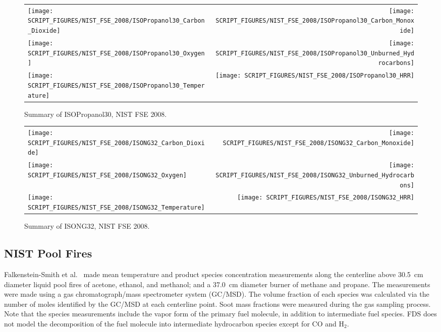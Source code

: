 \begin{figure}[p]
\begin{tabular*}{\textwidth}{l@{\extracolsep{\fill}}r}
\texttt{[image: SCRIPT\_FIGURES/NIST\_FSE\_2008/ISOPropanol30\_Carbon\_Dioxide]} &
\texttt{[image: SCRIPT\_FIGURES/NIST\_FSE\_2008/ISOPropanol30\_Carbon\_Monoxide]} \\
\texttt{[image: SCRIPT\_FIGURES/NIST\_FSE\_2008/ISOPropanol30\_Oxygen]} &
\texttt{[image: SCRIPT\_FIGURES/NIST\_FSE\_2008/ISOPropanol30\_Unburned\_Hydrocarbons]} \\
\texttt{[image: SCRIPT\_FIGURES/NIST\_FSE\_2008/ISOPropanol30\_Temperature]} &
\texttt{[image: SCRIPT\_FIGURES/NIST\_FSE\_2008/ISOPropanol30\_HRR]}
\end{tabular*}
\caption[Summary of ISOPropanol30, NIST FSE 2008]{Summary of ISOPropanol30, NIST FSE 2008.}
\label{NIST_FSE_1994_ISOPropanol30}
\end{figure}

\begin{figure}[p]
\begin{tabular*}{\textwidth}{l@{\extracolsep{\fill}}r}
\texttt{[image: SCRIPT\_FIGURES/NIST\_FSE\_2008/ISONG32\_Carbon\_Dioxide]} &
\texttt{[image: SCRIPT\_FIGURES/NIST\_FSE\_2008/ISONG32\_Carbon\_Monoxide]} \\
\texttt{[image: SCRIPT\_FIGURES/NIST\_FSE\_2008/ISONG32\_Oxygen]} &
\texttt{[image: SCRIPT\_FIGURES/NIST\_FSE\_2008/ISONG32\_Unburned\_Hydrocarbons]} \\
\texttt{[image: SCRIPT\_FIGURES/NIST\_FSE\_2008/ISONG32\_Temperature]} &
\texttt{[image: SCRIPT\_FIGURES/NIST\_FSE\_2008/ISONG32\_HRR]}
\end{tabular*}
\caption[Summary of ISONG32, NIST FSE 2008]{Summary of ISONG32, NIST FSE 2008.}
\label{NIST_FSE_1994_ISONG32}
\end{figure}


\clearpage

\subsection{NIST Pool Fires}
\label{sec:NIST_Pool_Fires}

Falkenstein-Smith et al.~\cite{Falkenstein-Smith:2019} made mean temperature and product species concentration measurements along the centerline above 30.5~cm diameter liquid pool fires of acetone, ethanol, and methanol; and a 37.0~cm diameter burner of methane and propane. The measurements were made using a gas chromatograph/mass spectrometer system (GC/MSD). The volume fraction of each species was calculated via the number of moles identified by the GC/MSD at each centerline point. Soot mass fractions were measured during the gas sampling process. Note that the species measurements include the vapor form of the primary fuel molecule, in addition to intermediate fuel species. FDS does not model the decomposition of the fuel molecule into intermediate hydrocarbon species except for CO and H$_2$.

